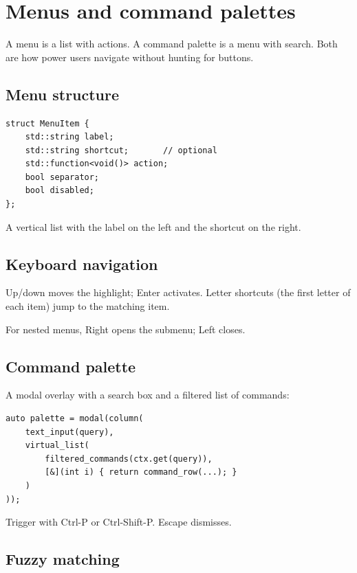 \chapter{Menus and command palettes}
\label{ch:menus}

\begin{aside}
A menu is a list with actions. A command palette is a menu
with search. Both are how power users navigate without
hunting for buttons.
\end{aside}

\section{Menu structure}

\begin{lstlisting}
struct MenuItem {
    std::string label;
    std::string shortcut;       // optional
    std::function<void()> action;
    bool separator;
    bool disabled;
};
\end{lstlisting}

A vertical list with the label on the left and the shortcut
on the right.

\section{Keyboard navigation}

Up/down moves the highlight; Enter activates. Letter
shortcuts (the first letter of each item) jump to the
matching item.

For nested menus, Right opens the submenu; Left closes.

\section{Command palette}

A modal overlay with a search box and a filtered list of
commands:

\begin{lstlisting}
auto palette = modal(column(
    text_input(query),
    virtual_list(
        filtered_commands(ctx.get(query)),
        [&](int i) { return command_row(...); }
    )
));
\end{lstlisting}

Trigger with Ctrl-P or Ctrl-Shift-P. Escape dismisses.

\section{Fuzzy matching}

